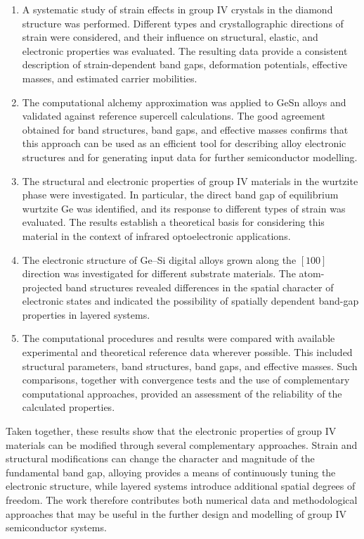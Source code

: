 \begin{enumerate}
	\item A systematic study of strain effects in group IV crystals in the diamond structure was performed. Different types and crystallographic directions of strain were considered, and their influence on structural, elastic, and electronic properties was evaluated. The resulting data provide a consistent description of strain-dependent band gaps, deformation potentials, effective masses, and estimated carrier mobilities.
	
	\item The computational alchemy approximation was applied to GeSn alloys and validated against reference supercell calculations. The good agreement obtained for band structures, band gaps, and effective masses confirms that this approach can be used as an efficient tool for describing alloy electronic structures and for generating input data for further semiconductor modelling.
	
	\item The structural and electronic properties of group IV materials in the wurtzite phase were investigated. In particular, the direct band gap of equilibrium wurtzite Ge was identified, and its response to different types of strain was evaluated. The results establish a theoretical basis for considering this material in the context of infrared optoelectronic applications.
	
	\item The electronic structure of Ge--Si digital alloys grown along the $[100]$ direction was investigated for different substrate materials. The atom-projected band structures revealed differences in the spatial character of electronic states and indicated the possibility of spatially dependent band-gap properties in layered systems.
	
	\item The computational procedures and results were compared with available experimental and theoretical reference data wherever possible. This included structural parameters, band structures, band gaps, and effective masses. Such comparisons, together with convergence tests and the use of complementary computational approaches, provided an assessment of the reliability of the calculated properties.
\end{enumerate}

Taken together, these results show that the electronic properties of group IV materials can be modified through several complementary approaches. Strain and structural modifications can change the character and magnitude of the fundamental band gap, alloying provides a means of continuously tuning the electronic structure, while layered systems introduce additional spatial degrees of freedom. The work therefore contributes both numerical data and methodological approaches that may be useful in the further design and modelling of group IV semiconductor systems.

